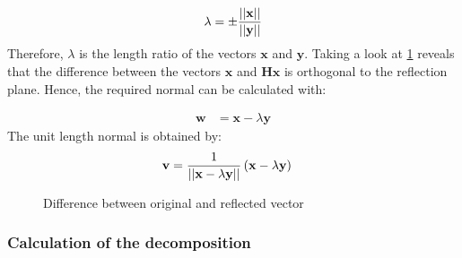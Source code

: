 \begin{align}
\label{eq:housholderCalculateReflectionLambda}
\lambda = \pm \frac{\left\vert\left\vert\mathbf{x}\right\vert\right\vert}{\left\vert\left\vert\mathbf{y}\right\vert\right\vert}
\end{align}
%
Therefore, $\lambda$ is the length ratio of the vectors $\mathbf{x}$ and $\mathbf{y}$.
Taking a look at \cref{fig:housholderCalculateReflection} reveals that the difference between the vectors $\mathbf{x}$ and $\mathbf{Hx}$ is orthogonal to the reflection plane.
Hence, the required normal can be calculated with:

\begin{align}
\label{eq:housholderCalculateReflectionNormal}
\mathbf{w} &= \mathbf{x} - \lambda \mathbf{y}
\end{align}
%
The unit length normal is obtained by:
%
\begin{align}
\label{eq:housholderCalculateReflectionUnitNormal}
\mathbf{v} &= \frac{1}{\left\vert\left\vert\mathbf{x} - \lambda \mathbf{y}\right\vert\right\vert}\left(\mathbf{x} - \lambda \mathbf{y}\right)
\end{align}


\begin{figure}
\centering
{}
\caption{Difference between original and reflected vector}
\label{fig:housholderCalculateReflection}
\end{figure}




\subsubsection{Calculation of the decomposition}
\label{sec:qrCalculateDecomposition}

